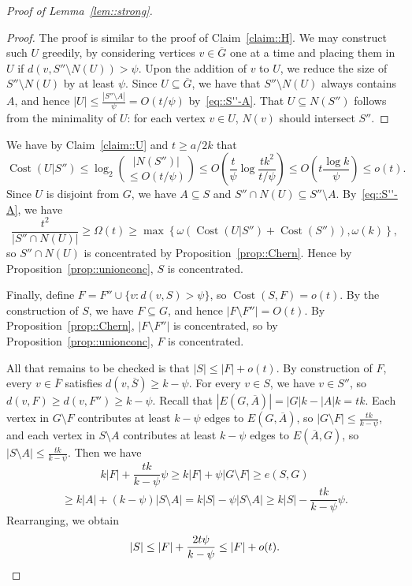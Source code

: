 \documentclass[12pt]{article}
\renewcommand{\bar}[1]{\overline{#1}}
\DeclareMathOperator{\cost}{Cost}
\begin{document}
\begin{proof}[Proof of Lemma~\ref{lem::strong}]
\begin{proof}
The proof is similar to the proof of Claim~\ref{claim::H}. We may construct such $U$ greedily, by considering vertices $v \in \bar{G}$ one at a time and placing them in $U$ if $d(v,S'' \setminus N(U)) > \psi$. Upon the addition of $v$ to $U$, we reduce the size of $S'' \setminus N(U)$ by at least $\psi$. Since $U \subseteq \bar{G}$, we have that $S'' \setminus N(U)$ always contains $A$, and hence $|U| \leq \frac{|S'' \setminus A|}{\psi} = O(t/\psi)$ by~\eqref{eq::S''-A}. That $U \subseteq N(S'')$ follows from the minimality of $U$: for each vertex $v \in U$, $N(v)$ should intersect $S''$.
\end{proof}

We have by Claim~\ref{claim::U} and $t \geq a/2k$ that
\[ \cost(U|S'') \leq \log_2\binom{|N(S'')|}{\leq O(t/\psi)} \leq O\left( \frac{t}{\psi} \log\frac{tk^2}{t/\psi} \right) \leq O\left( t \frac{\log k}{\psi} \right) \leq o(t) .\]
Since $U$ is disjoint from $G$, we have $A \subseteq S$ and $S'' \cap N(U) \subseteq S'' \setminus A$. By~\eqref{eq::S''-A}, we have
\[ \frac{t^2}{|S'' \cap N(U)|} \geq \Omega(t) \geq \max\left\{\omega(\cost(U|S'') + \cost(S'')), \omega(k)\right\} ,\]
so $S'' \cap N(U)$ is concentrated by Proposition~\ref{prop::Chern}. Hence by Proposition~\ref{prop::unionconc}, $S$ is concentrated.

Finally, define $F = F'' \cup \{v : d(v,S)>\psi\}$, so $\cost(S,F) = o(t)$. By the construction of $S$, we have $F \subseteq G$, and hence $|F \setminus F''| = O(t)$. By Proposition~\ref{prop::Chern}, $|F \setminus F''|$ is concentrated, so by Proposition~\ref{prop::unionconc}, $F$ is concentrated.

All that remains to be checked is that $|S| \leq |F| + o(t)$. By construction of $F$, every $v \in \bar{F}$ satisfies $d(v,\bar{S}) \geq k-\psi$. For every $v \in S$, we have $v \in S''$, so $d(v,F) \geq d(v,F'') \geq k-\psi$. Recall that $|E(G,\bar{A})| = |G|k - |A|k = tk$. Each vertex in $G \setminus F$ contributes at least $k-\psi$ edges to $E(G,\bar{A})$, so $|G \setminus F| \leq \frac{tk}{k-\psi}$, and each vertex in $S \setminus A$ contributes at least $k-\psi$ edges to $E(\bar{A},G)$, so $|S \setminus A| \leq \frac{tk}{k-\psi}$. Then we have
\[ k|F| + \frac{tk}{k-\psi} \psi \geq k|F| + \psi |G \setminus F| \geq e(S,G) \]
\[ \geq k|A| + (k-\psi)|S\setminus A| = k|S| - \psi |S\setminus A| \geq k|S| - \frac{tk}{k-\psi}\psi .\]
Rearranging, we obtain
\[ |S| \leq |F| + \frac{2t\psi}{k-\psi} \leq |F| + o(t) .\qedhere\]
\end{proof}
\end{document}
